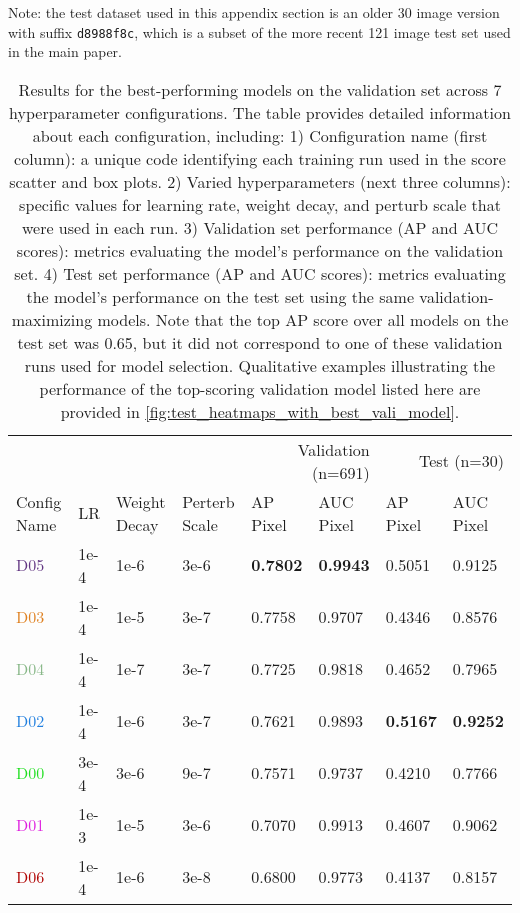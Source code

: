 Note:
the test dataset used in this appendix section is an older 30 image version with suffix {\tt d8988f8c},
  which is a subset of the more recent 121 image test set used in the main paper.


\begin{table*}[t]
\caption{
Results for the best-performing models on the validation set across 7 hyperparameter configurations.
The table provides detailed information about each configuration, including:
1) Configuration name (first column): a unique code identifying each training run used in the score scatter and box plots.
2) Varied hyperparameters (next three columns): specific values for learning rate, weight decay, and perturb scale that were used in each run.
3) Validation set performance (AP and AUC scores): metrics evaluating the model's performance on the validation set.
4) Test set performance (AP and AUC scores): metrics evaluating the model's performance on the test set using the same validation-maximizing models.
Note that the top AP score over all models on the test set was 0.65, but it did not correspond to one of these validation runs used for model selection.
Qualitative examples illustrating the performance of the top-scoring validation model listed here are provided in \cref{fig:test_heatmaps_with_best_vali_model}.
}
\label{tab:parameters_and_results}
\centering
\begin{tabular}{llllllll}
\toprule
            \multicolumn{4}{l}{} & \multicolumn{2}{r}{Validation (n=691)} & \multicolumn{2}{r}{Test (n=30)} \\
Config Name  &   LR & Weight Decay & Perterb Scale & \makecell{AP\\Pixel} & \makecell{AUC\\Pixel} &  \makecell{AP\\Pixel} &  \makecell{AUC\\Pixel} \\
\midrule
        \textcolor[HTML]{623682}{D05} & 1e-4 &   1e-6 &  3e-6 & \textbf{0.7802} & \textbf{0.9943} &          0.5051 &          0.9125 \\
        \textcolor[HTML]{df8020}{D03} & 1e-4 &   1e-5 &  3e-7 &          0.7758 &          0.9707 &          0.4346 &          0.8576 \\
        \textcolor[HTML]{87b787}{D04} & 1e-4 &   1e-7 &  3e-7 &          0.7725 &          0.9818 &          0.4652 &          0.7965 \\
        \textcolor[HTML]{207fdf}{D02} & 1e-4 &   1e-6 &  3e-7 &          0.7621 &          0.9893 & \textbf{0.5167} & \textbf{0.9252} \\
        \textcolor[HTML]{20df20}{D00} & 3e-4 &   3e-6 &  9e-7 &          0.7571 &          0.9737 &          0.4210 &          0.7766 \\
        \textcolor[HTML]{df20df}{D01} & 1e-3 &   1e-5 &  3e-6 &          0.7070 &          0.9913 &          0.4607 &          0.9062 \\
        \textcolor[HTML]{b00403}{D06} & 1e-4 &   1e-6 &  3e-8 &          0.6800 &          0.9773 &          0.4137 &          0.8157 \\
        

\end{tabular}
\end{table*}
